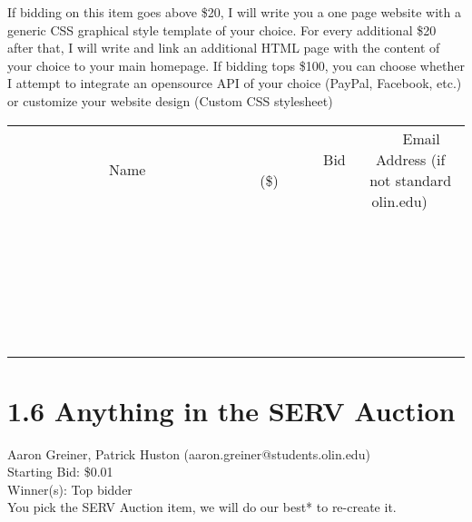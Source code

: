 \documentclass[11pt]{article}
\begin{document}
If bidding on this item goes above \$20, I will write you a one page website with a generic CSS graphical style template of your choice.
For every additional \$20 after that, I will write and link an additional HTML page with the content of your choice to your main homepage.
If bidding tops \$100, you can choose whether I attempt to integrate an opensource API of your choice (PayPal, Facebook, etc.) or customize your website design (Custom CSS stylesheet) \\[6ex]
\begin{tabular}{c c c}
~~~~~~~~~~~~~Name~~~~~~~~~~~~~ & ~~~~~~~~~Bid (\$)~~~~~~~~~ & ~~~Email Address (if not standard olin.edu)~~~ \\
 & & \\
\hline
 & & \\
\hline
 & & \\
\hline
 & & \\
\hline
 & & \\
\hline
 & & \\
\hline
 & & \\
\hline
 & & \\
\hline
 & & \\
\hline
 & & \\
\hline
 & & \\
\hline
 & & \\
\hline
 & & \\
\hline
 & & \\
\hline
 & & \\
\hline
 & & \\
\hline
 & & \\
\hline
 & & \\
\hline
 & & \\
\hline
 & & \\
\hline
 & & \\
\hline
 & & \\
\hline
 & & \\
\hline
 & & \\
\hline
 & & \\
\hline
 & & \\
\hline
\end{tabular}
\clearpage
\section*{1.6 Anything in the SERV Auction}
Aaron Greiner, Patrick Huston (aaron.greiner@students.olin.edu) \\
Starting Bid: \$0.01 \\
Winner(s): 
Top bidder \\
You pick the SERV Auction item, we will do our best* to re-create it.
\end{document}
